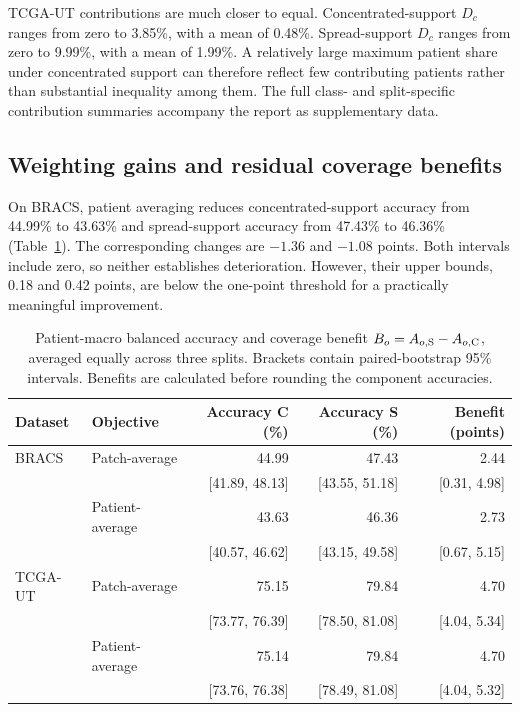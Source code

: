 \noindent TCGA-UT contributions are much closer to equal. Concentrated-support \(D_c\) ranges from zero to 3.85\%, with a mean of 0.48\%. Spread-support \(D_c\) ranges from zero to 9.99\%, with a mean of 1.99\%. A relatively large maximum patient share under concentrated support can therefore reflect few contributing patients rather than substantial inequality among them. The full class- and split-specific contribution summaries accompany the report as supplementary data.

\subsection{Weighting gains and residual coverage benefits}
On BRACS, patient averaging reduces concentrated-support accuracy from 44.99\% to 43.63\% and spread-support accuracy from 47.43\% to 46.36\% (Table~\ref{tab:accuracy-results}). The corresponding changes are $-1.36$ and $-1.08$ points. Both intervals include zero, so neither establishes deterioration. However, their upper bounds, 0.18 and 0.42 points, are below the one-point threshold for a practically meaningful improvement.

\begin{table}[htbp]
\centering\small
\setlength{\tabcolsep}{4pt}
\begin{tabular}{@{}llrrr@{}}
\toprule
Dataset & Objective & Accuracy C (\%) & Accuracy S (\%) & Benefit (points) \\
\midrule
BRACS & Patch-average & 44.99 & 47.43 & 2.44 \\
& & [41.89, 48.13] & [43.55, 51.18] & [0.31, 4.98] \\
& Patient-average & 43.63 & 46.36 & 2.73 \\
& & [40.57, 46.62] & [43.15, 49.58] & [0.67, 5.15] \\
\addlinespace
TCGA-UT & Patch-average & 75.15 & 79.84 & 4.70 \\
& & [73.77, 76.39] & [78.50, 81.08] & [4.04, 5.34] \\
& Patient-average & 75.14 & 79.84 & 4.70 \\
& & [73.76, 76.38] & [78.49, 81.08] & [4.04, 5.32] \\
\bottomrule
\end{tabular}
\caption{Patient-macro balanced accuracy and coverage benefit \(B_o=A_{o,\mathrm{S}}-A_{o,\mathrm{C}}\), averaged equally across three splits. Brackets contain paired-bootstrap 95\% intervals. Benefits are calculated before rounding the component accuracies.}
\label{tab:accuracy-results}
\end{table}

